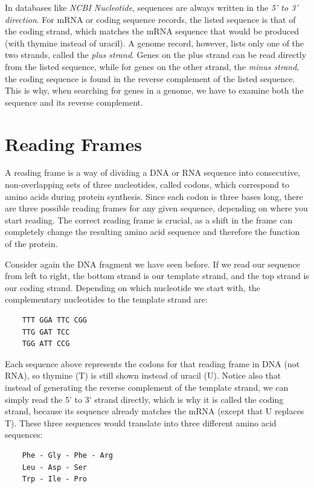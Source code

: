 In databases like {\em NCBI Nucleotide}, sequences are always written in the {\em 5' to 3' direction}. For mRNA or coding sequence records, the listed sequence is that of the coding strand, which matches the mRNA sequence that would be produced (with thymine instead of uracil). A genome record, however, lists only one of the two strands, called the {\em plus strand}. Genes on the plus strand can be read directly from the listed sequence, while for genes on the other strand, the {\em minus strand}, the coding sequence is found in the reverse complement of the listed sequence. This is why, when searching for genes in a genome, we have to examine both the sequence and its reverse complement.

\section{Reading Frames}

A reading frame is a way of dividing a DNA or RNA sequence into consecutive, non-overlapping sets of three nucleotides, called codons, which correspond to amino acids during protein synthesis. Since each codon is three bases long, there are three possible reading frames for any given sequence, depending on where you start reading. The correct reading frame is crucial, as a shift in the frame can completely change the resulting amino acid sequence and therefore the function of the protein.

Consider again the DNA fragment we have seen before. If we read our sequence from left to right, the bottom strand is our template strand, and the top strand is our coding strand. Depending on which nucleotide we start with, the complementary nucleotides to the template strand are:

\begin{verbatim}
    TTT GGA TTC CGG
    TTG GAT TCC
    TGG ATT CCG
\end{verbatim}

Each sequence
above represents the codons for that reading frame in DNA (not RNA), so thymine (T) is still shown instead of uracil (U). Notice also that instead of generating the reverse complement of the template strand, we can simply read the 5' to 3' strand directly, which is why it is called the coding strand, because its sequence already matches the mRNA (except that U replaces T). These three sequences would translate into three different amino acid sequences:
%
\begin{verbatim}
    Phe - Gly - Phe - Arg
    Leu - Asp - Ser
    Trp - Ile - Pro
\end{verbatim}

